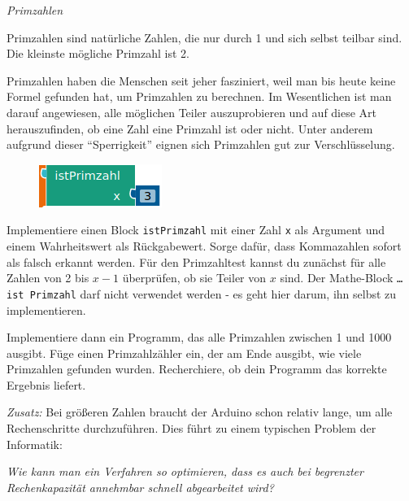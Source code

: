 \begin{aufgabe} \emph{Primzahlen}
	
	Primzahlen sind natürliche Zahlen, die nur durch 1 und sich selbst teilbar sind. Die kleinste mögliche Primzahl ist 2.
	
	Primzahlen haben die Menschen seit jeher fasziniert, weil man bis heute keine Formel gefunden hat, um Primzahlen zu berechnen. Im Wesentlichen ist man darauf angewiesen, alle möglichen Teiler auszuprobieren und auf diese Art herauszufinden, ob eine Zahl eine Primzahl ist oder nicht. Unter anderem aufgrund dieser \enquote{Sperrigkeit} eignen sich Primzahlen gut zur Verschlüsselung.
	
	\medskip
	\begin{figure}
		\centering
		\includegraphics[width=\linewidth]{./pics/istPrimzahl-Block.png}
	\end{figure}
	Implementiere einen Block \texttt{istPrimzahl} mit einer Zahl \texttt{x} als Argument und einem Wahrheitswert als Rückgabewert. Sorge dafür, dass Kommazahlen sofort als falsch erkannt werden. Für den Primzahltest kannst du zunächst für alle Zahlen von 2 bis $x-1$ überprüfen, ob sie Teiler von $x$ sind. Der Mathe-Block \texttt{\dots ist Primzahl} darf nicht verwendet werden - es geht hier darum, ihn selbst zu implementieren.
	
	Implementiere dann ein Programm, das alle Primzahlen zwischen 1 und 1000 ausgibt. Füge einen Primzahlzähler ein, der am Ende ausgibt, wie viele Primzahlen gefunden wurden. Recherchiere, ob dein Programm das korrekte Ergebnis liefert.
	
	\bigskip
	\emph{Zusatz:} Bei größeren Zahlen braucht der Arduino schon relativ lange, um alle Rechenschritte durchzuführen. Dies führt zu einem typischen Problem der Informatik:
	\begin{center}
		\emph{Wie kann man ein Verfahren so optimieren, dass es auch bei begrenzter Rechenkapazität annehmbar schnell abgearbeitet wird?}
	\end{center}
	

\end{aufgabe}
